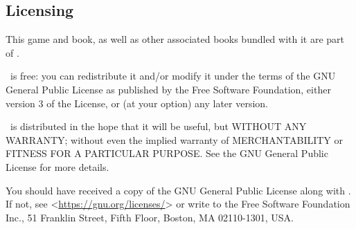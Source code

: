 \subsection{Licensing}
\par
\hypertarget{Licensing}{This game and book, as well as other associated books bundled with it are part of \getTitle .}

\par
\getTitle\, is free: you can redistribute it and/or modify it under the terms of the GNU General Public License as published by the Free Software Foundation, either version 3 of the License, or (at your option) any later version.

\par
\getTitle\, is distributed in the hope that it will be useful, but WITHOUT ANY WARRANTY; without even the implied warranty of MERCHANTABILITY or FITNESS FOR A PARTICULAR PURPOSE. See the GNU General Public License for more details.

You should have received a copy of the GNU General Public License along with \getTitle . If not, see <\href{https://gnu.org/licenses/}{https://gnu.org/licenses/}> or write to the Free Software Foundation Inc., 51 Franklin Street, Fifth Floor, Boston, MA 02110-1301, USA.